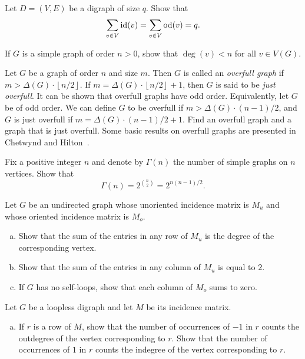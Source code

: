 \begin{problem}
\item Let $D = (V, E)$ be a digraph of size $q$. Show that
  \[
  \sum_{v \in V} \operatorname*{id}(v)
  =
  \sum_{v \in V} \operatorname*{od}(v)
  =
  q.
  \]

\item If $G$ is a simple graph of order $n > 0$, show that
  $\deg(v) < n$ for all $v \in V(G)$.

\item Let $G$ be a graph of order $n$ and size $m$. Then $G$ is called
  an \emph{overfull graph} if
  $m > \Delta(G) \cdot \left\lfloor n / 2 \right\rfloor$. If
  $m = \Delta(G) \cdot \left\lfloor n / 2 \right\rfloor + 1$, then $G$
  is said to be \emph{just overfull}. It can be shown that overfull
  graphs have odd order. Equivalently, let $G$ be of odd order. We can
  define $G$ to be overfull if $m > \Delta(G) \cdot (n-1)/2$,
  and $G$ is just overfull if $m = \Delta(G) \cdot (n-1)/2 + 1$. Find
  an overfull graph and a graph that is just overfull. Some basic
  results on overfull graphs are presented in Chetwynd and
  Hilton~\cite{ChetwyndHilton1986}.

\item\label{prob:introduction:number_simple_graphs}
  Fix a positive integer $n$ and denote by $\Gamma(n)$ the number of
  simple graphs on $n$ vertices. Show that
  \[
  \Gamma(n)
  =
  2^{\binom{n}{2}}
  =
  2^{n(n-1) / 2}.
  \]

\item Let $G$ be an undirected graph whose unoriented incidence matrix
  is $M_u$ and whose oriented incidence matrix is $M_o$.
  \begin{enumerate}[(a)]
  \item Show that the sum of the entries in any row of $M_u$ is the
    degree of the corresponding vertex.

  \item Show that the sum of the entries in any column of $M_u$ is
    equal to $2$.

  \item If $G$ has no self-loops, show that each column of $M_o$ sums
    to zero.
  \end{enumerate}

\item Let $G$ be a loopless digraph and let $M$ be its incidence
  matrix.
  \begin{enumerate}[(a)]
  \item If $r$ is a row of $M$, show that the number of occurrences of
    $-1$ in $r$ counts the outdegree of the vertex corresponding to
    $r$. Show that the number of occurrences of $1$ in $r$ counts the
    indegree of the vertex corresponding to $r$.


\end{enumerate}
\end{problem}
